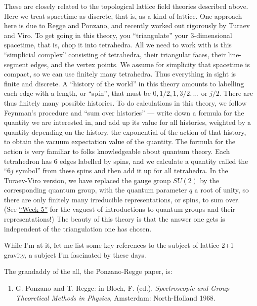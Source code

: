 \documentclass{article}
\def\tightlist{}
\begin{document}
These are closely related to the topological lattice field theories
described above. Here we treat spacetime as discrete, that is, as a kind
of lattice. One approach here is due to Regge and Ponzano, and recently
worked out rigorously by Turaev and Viro. To get going in this theory,
you ``triangulate'' your 3-dimensional spacetime, that is, chop it into
tetrahedra. All we need to work with is this ``simplicial complex''
consisting of tetrahedra, their triangular faces, their line-segment
edges, and the vertex points. We assume for simplicity that spacetime is
compact, so we can use finitely many tetrahedra. Thus everything in
sight is finite and discrete. A ``history of the world'' in this theory
amounts to labelling each edge with a length, or ``spin'', that must be
\(0,1/2,1,3/2,\ldots\) or \(j/2\). There are thus finitely many possible
histories. To do calculations in this theory, we follow Feynman's
procedure and ``sum over histories'' --- write down a formula for the
quantity we are interested in, and add up its value for all histories,
weighted by a quantity depending on the history, the exponential of the
action of that history, to obtain the vacuum expectation value of the
quantity. The formula for the action is very familiar to folks
knowledgeable about quantum theory. Each tetrahedron has 6 edges
labelled by spins, and we calculate a quantity called the ``\(6j\)
symbol'' from these spins and then add it up for all tetrahedra. In the
Turaev-Viro version, we have replaced the gauge group \(SU(2)\) by the
corresponding quantum group, with the quantum parameter \(q\) a root of
unity, so there are only finitely many irreducible representations, or
spins, to sum over. (See \protect\hyperlink{week5}{``Week 5''} for the
vaguest of introductions to quantum groups and their representations!)
The beauty of this theory is that the answer one gets is independent of
the triangulation one has chosen.

While I'm at it, let me list some key references to the subject of
lattice 2+1 gravity, a subject I'm fascinated by these days.

The grandaddy of the all, the Ponzano-Regge paper, is:

\begin{enumerate}
\def\labelenumi{\arabic{enumi})}
\setcounter{enumi}{5}
\tightlist
\item
  G. Ponzano and T. Regge: in Bloch, F. (ed.), \emph{Spectroscopic and
  Group Theoretical Methods in Physics}, Amsterdam: North-Holland 1968.
\end{enumerate}
\end{document}
